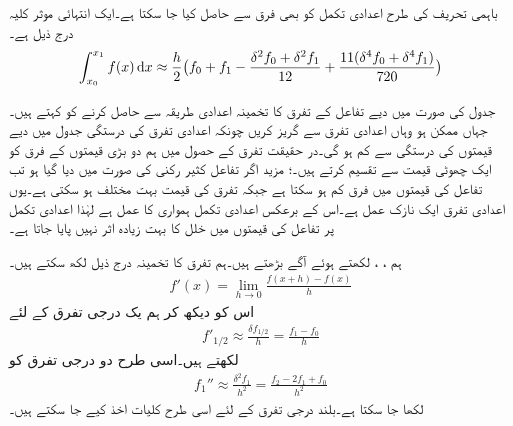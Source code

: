 باہمی تحریف کی طرح اعدادی تکمل کو بھی فرق سے حاصل کیا جا سکتا ہے۔ایک انتہائی موثر کلیہ درج ذیل   ہے۔
\begin{align}
\int_{x_0}^{x_1}f(x)\dif x\approx \frac{h}{2}\big(f_0+f_1-\frac{\delta^2 f_0+\delta^2f_1}{12}+\frac{11(\delta^4f_0+\delta^4f_1)}{720}\big)
\end{align}

جدول کی صورت میں دیے تفاعل کے تفرق کا تخمینہ اعدادی طریقہ  سے حاصل کرنے  کو  کہتے ہیں۔ جہاں ممکن ہو وہاں اعدادی تفرق سے گریز کریں چونکہ اعدادی تفرق کی درستگی  جدول میں دیے قیمتوں کی درستگی سے کم ہو گی۔در حقیقت تفرق کے حصول میں ہم دو بڑی قیمتوں کے فرق کو ایک چھوٹی قیمت سے تقسیم کرتے ہیں۔؛ مزید اگر تفاعل کثیر رکنی  کی صورت میں دیا گیا ہو تب تفاعل کی قیمتوں میں فرق کم ہو سکتا ہے جبکہ تفرق کی قیمت بہت مختلف ہو سکتی ہے۔یوں اعدادی تفرق ایک نازک عمل ہے۔اس کے برعکس اعدادی تکمل ہمواری کا عمل ہے لہٰذا اعدادی تکمل  پر تفاعل کی قیمتوں میں خلل کا بہت زیادہ اثر نہیں پایا جاتا ہے۔

ہم ، ،  لکھتے ہوئے آگے بڑھتے ہیں۔ہم تفرق کا تخمینہ درج ذیل لکھ سکتے ہیں۔
\begin{align*}
f'(x)=\lim_{h\to 0}\frac{f(x+h)-f(x)}{h}
\end{align*}
اس کو دیکھ کر ہم یک درجی تفرق کے لئے
\begin{align}\label{مساوات_اعدادی_تفرق_کلیہ_الف}
f'_{1/2}\approx \frac{\delta f_{1/2}}{h}=\frac{f_1-f_0}{h}
\end{align}
لکھتے ہیں۔اسی طرح دو درجی تفرق کو
\begin{align}\label{مساوات_اعدادی_تفرق_کلیہ_ب}
f_1''\approx \frac{\delta^2 f_1}{h^2}=\frac{f_2-2f_1+f_0}{h^2}
\end{align}
لکھا جا سکتا ہے۔بلند درجی تفرق کے لئے اسی طرح کلیات اخذ کیے جا سکتے ہیں۔

